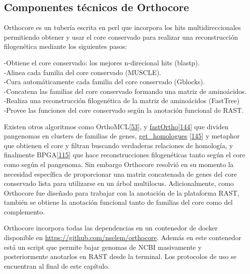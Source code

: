 \documentclass[12pt,twoside]{reedthesis}
\begin{document}
  \subsection{Componentes técnicos de
  Orthocore}\label{componentes-tecnicos-de-orthocore}
  
  Orthocore es un tubería escrita en perl que incorpora los hits
  multidireccionales permitiendo obtener y usar el core conservado para
  realizar una reconstrucción filogenética mediante los siguientes pasos:
  
  -Obtiene el core conservado: los mejores n-direcional hits (blastp).\\
  -Alinea cada familia del core conservado (MUSCLE).\\
  -Cura automáticamente cada familia del core conservado (Gblocks).\\
  -Concatena las familias del core conservado formando una matriz de
  aminoácidos.\\
  -Realiza una reconstrucción filogenética de la matriz de aminoácidos
  (FastTree)\\
  -Provee las funciones del core conservado según la anotación funcional
  de RAST.
  
  Existen otros algoritmos como
  OrthoMCL{[}\protect\hyperlink{ref-li_orthomcl_2003}{53}{]}, y
  \href{https://github.com/grovesdixon/using_FastOrtho}{fastOrtho}{[}\protect\hyperlink{ref-wattam_patric_2014}{144}{]}
  que dividen pangenomas en clusters de familias de genes,
  \href{http://eead-csic-compbio.github.io/get_homologues/manual/}{get\_homologues}
  {[}\protect\hyperlink{ref-contreras-moreira_get_homologues_2013}{145}{]}
  y metaphor que obtienen el core y filtran buscando verdaderas relaciones
  de homología, y finalmente
  BPGA{[}\protect\hyperlink{ref-chaudhari_bpga-_2016}{115}{]} que hace
  reconstrucciones filogenéticas tanto según el core como según el
  pangenoma. Sin embargo Orthocore resolvió en su momento la necesidad
  específica de proporcionar una matriz concatenada de genes del core
  conservado lista para utilizarse en un árbol multilocus. Adicionalmente,
  como Orthocore fue diseñado para trabajar con la anotación de la
  plataforma RAST, también se obtiene la anotación funcional tanto de
  familias del core como del complemento.
  
  Orthocore incorpora todas las dependencias en un contenedor de docker
  disponible en \url{https://github.com/nselem/orthocore}. Además en este
  contenedor está un script que permite bajar genomas de NCBI masivamente
  y posteriormente anotarlos en RAST desde la terminal. Los protocolos de
  uso se encuentran al final de este capítulo.
  
\end{document}
